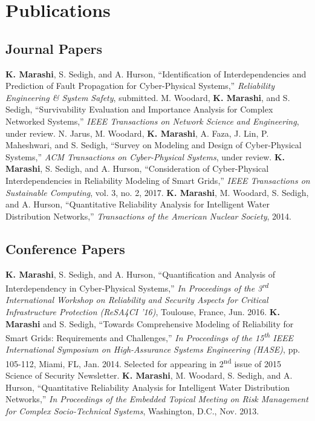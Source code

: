 \section{Publications}
\subsection{Journal Papers}
\begin{cvpubs}
  \cvpub
    {\textbf{K. Marashi}, S. Sedigh, and A. Hurson, ``Identification of Interdependencies and Prediction of Fault Propagation for Cyber-Physical Systems,'' \textit{Reliability Engineering \& System Safety}, submitted.}
  \cvpub
    {M. Woodard, \textbf{K. Marashi}, and S. Sedigh, ``Survivability Evaluation and Importance Analysis for Complex Networked Systems,'' \textit{IEEE Transactions on Network Science and Engineering}, under review.}
  \cvpub
    {N. Jarus, M. Woodard, \textbf{K. Marashi}, A. Faza, J. Lin, P. Maheshwari, and S. Sedigh, ``Survey on Modeling and Design of Cyber-Physical Systems,'' \textit{ACM Transactions on Cyber-Physical Systems}, under review.}
  \cvpub
    {\textbf{K. Marashi}, S. Sedigh, and A. Hurson, ``Consideration of Cyber-Physical Interdependencies in Reliability Modeling of Smart Grids,'' \textit{IEEE Transactions on Sustainable Computing}, vol. 3, no. 2, 2017.}
  \cvpub
    {\textbf{K. Marashi}, M. Woodard, S. Sedigh, and A. Hurson, ``Quantitative Reliability Analysis for Intelligent Water Distribution Networks,'' \textit{Transactions of the American Nuclear Society}, 2014.}
\end{cvpubs}

\subsection{Conference Papers}
\begin{cvpubs}
  \cvpub
    {\textbf{K. Marashi}, S. Sedigh, and A. Hurson, ``Quantification and Analysis of Interdependency in Cyber-Physical Systems,'' \textit{In Proceedings of the 3\textsuperscript{rd} International Workshop on Reliability and Security Aspects for Critical Infrastructure Protection (ReSA4CI '16)}, Toulouse, France, Jun. 2016.}
  \cvpub
    {\textbf{K. Marashi} and S. Sedigh, ``Towards Comprehensive Modeling of Reliability for Smart Grids: Requirements and Challenges,'' \textit{In Proceedings of the 15\textsuperscript{th} IEEE International Symposium on High-Assurance Systems Engineering (HASE)}, pp. 105-112, Miami, FL, Jan. 2014. Selected for appearing in 2\textsuperscript{nd} issue of 2015 Science of Security Newsletter.}
  \cvpub
    {\textbf{K. Marashi}, M. Woodard, S. Sedigh, and A. Hurson, ``Quantitative Reliability Analysis for Intelligent Water Distribution Networks,'' \textit{In Proceedings of the Embedded Topical Meeting on Risk Management for Complex Socio-Technical Systems}, Washington, D.C., Nov. 2013.}
\end{cvpubs}

